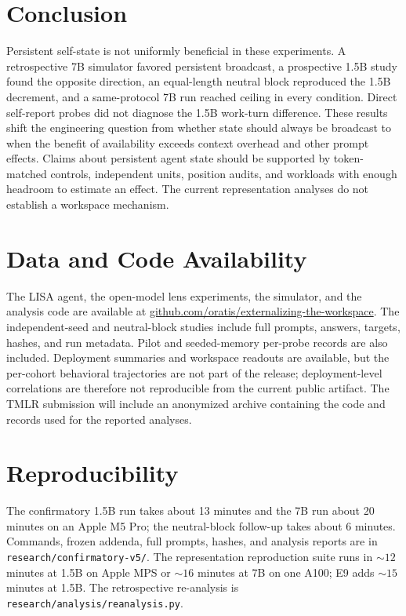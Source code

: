 \documentclass[11pt]{article}
\begin{document}
\section{Conclusion}
Persistent self-state is not uniformly beneficial in these experiments. A retrospective 7B simulator favored persistent broadcast, a prospective 1.5B study found the opposite direction, an equal-length neutral block reproduced the 1.5B decrement, and a same-protocol 7B run reached ceiling in every condition. Direct self-report probes did not diagnose the 1.5B work-turn difference. These results shift the engineering question from whether state should always be broadcast to when the benefit of availability exceeds context overhead and other prompt effects. Claims about persistent agent state should be supported by token-matched controls, independent units, position audits, and workloads with enough headroom to estimate an effect. The current representation analyses do not establish a workspace mechanism.

\section*{Data and Code Availability}
The LISA agent, the open-model lens experiments, the simulator, and the analysis code are available at \href{https://github.com/oratis/externalizing-the-workspace}{github.com/oratis/externalizing-the-workspace}. The independent-seed and neutral-block studies include full prompts, answers, targets, hashes, and run metadata. Pilot and seeded-memory per-probe records are also included. Deployment summaries and workspace readouts are available, but the per-cohort behavioral trajectories are not part of the release; deployment-level correlations are therefore not reproducible from the current public artifact. The TMLR submission will include an anonymized archive containing the code and records used for the reported analyses.

\section*{Reproducibility}
The confirmatory 1.5B run takes about 13 minutes and the 7B run about 20 minutes on an Apple M5 Pro; the neutral-block follow-up takes about 6 minutes. Commands, frozen addenda, full prompts, hashes, and analysis reports are in \texttt{research/confirmatory-v5/}. The representation reproduction suite runs in ${\sim}12$ minutes at 1.5B on Apple MPS or ${\sim}16$ minutes at 7B on one A100; E9 adds ${\sim}15$ minutes at 1.5B. The retrospective re-analysis is \texttt{research/analysis/reanalysis.py}.
\end{document}
